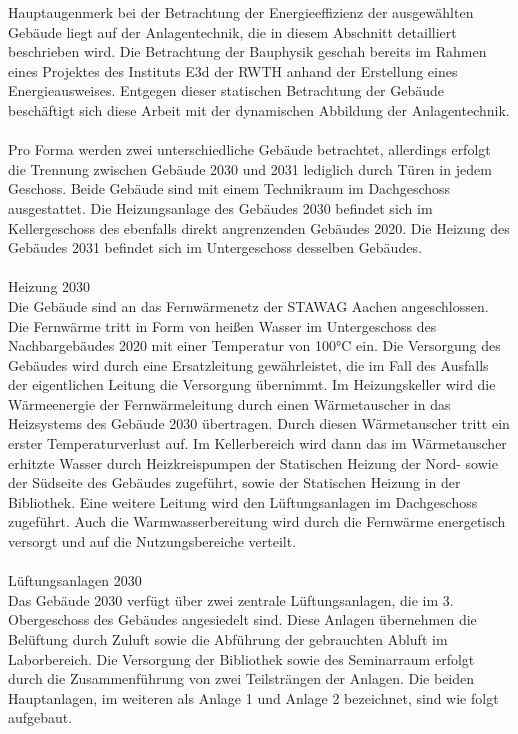 Hauptaugenmerk bei der Betrachtung der Energieeffizienz der ausgewählten Gebäude liegt auf der Anlagentechnik, die in diesem Abschnitt detailliert beschrieben wird. Die Betrachtung der Bauphysik geschah bereits im Rahmen eines Projektes des Instituts E3d der RWTH anhand der Erstellung eines Energieausweises. Entgegen dieser statischen Betrachtung der Gebäude beschäftigt sich diese Arbeit mit der dynamischen Abbildung der Anlagentechnik.\\
\\
Pro Forma werden zwei unterschiedliche Gebäude betrachtet, allerdings erfolgt die Trennung zwischen Gebäude 2030 und 2031  lediglich durch Türen in jedem Geschoss. Beide Gebäude sind mit einem Technikraum im Dachgeschoss ausgestattet. Die Heizungsanlage des Gebäudes 2030 befindet sich im Kellergeschoss des ebenfalls direkt angrenzenden Gebäudes 2020. Die Heizung des Gebäudes 2031 befindet sich im Untergeschoss desselben Gebäudes.\\
\\
Heizung 2030\\
Die Gebäude sind an das Fernwärmenetz der STAWAG Aachen angeschlossen. Die Fernwärme tritt in Form von heißen Wasser im Untergeschoss des Nachbargebäudes 2020 mit einer Temperatur von 100°C ein. Die Versorgung des Gebäudes wird durch eine Ersatzleitung gewährleistet, die im Fall des Ausfalls der eigentlichen Leitung die Versorgung übernimmt. Im Heizungskeller wird die Wärmeenergie der Fernwärmeleitung durch einen Wärmetauscher in das Heizsystems des Gebäude 2030 übertragen. Durch diesen Wärmetauscher tritt ein erster Temperaturverlust auf. Im Kellerbereich wird dann das im Wärmetauscher erhitzte Wasser durch Heizkreispumpen der Statischen Heizung der Nord- sowie der Südseite des Gebäudes zugeführt, sowie der Statischen Heizung in der Bibliothek. Eine weitere Leitung wird den Lüftungsanlagen im Dachgeschoss zugeführt. Auch die Warmwasserbereitung wird durch die Fernwärme energetisch versorgt und auf die Nutzungsbereiche verteilt. \\
\\
Lüftungsanlagen 2030\\
Das Gebäude 2030 verfügt über zwei zentrale Lüftungsanlagen, die im 3. Obergeschoss des Gebäudes angesiedelt sind. Diese Anlagen übernehmen die Belüftung durch Zuluft sowie die Abführung der gebrauchten Abluft im Laborbereich. Die Versorgung der Bibliothek sowie des Seminarraum erfolgt durch die Zusammenführung von zwei Teilsträngen der Anlagen. Die beiden Hauptanlagen, im weiteren als Anlage 1 und Anlage 2 bezeichnet, sind wie folgt aufgebaut.\\
